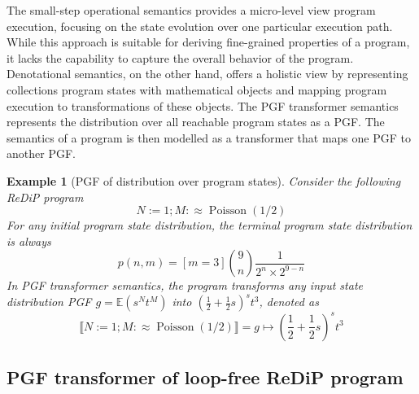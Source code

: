 \documentclass[a4paper]{article}
\renewcommand{\S}[1]{ \llbracket #1 \rrbracket }
\newcommand{\E}{ \mathbb{E} }
\newtheorem{example}[theorem]{Example}
\begin{document}
The small-step operational semantics provides a micro-level view program execution, focusing on the state evolution over one particular execution path. While this approach is suitable for deriving fine-grained properties of a program, it lacks the capability to capture the overall behavior of the program.
Denotational semantics, on the other hand, offers a holistic view by representing collections program states with mathematical objects and mapping program execution to transformations of these objects.
The PGF transformer semantics represents the distribution over all reachable program states as a PGF. The semantics of a program is then modelled as a transformer that maps one PGF to another PGF.

\begin{example}[PGF of distribution over program states]
	Consider the following ReDiP program
	\[
		N := 1; M :\approx \operatorname{Poisson}(1/2)
	\]
	For any initial program state distribution, the terminal program state distribution is always
	\[
		p(n,m) = [m=3] \binom{9}{n}\frac{1}{2^n \times 2^{9-n}}
	\]
	In PGF transformer semantics, the program transforms any input state distribution PGF \(g=\E(s^N t^M)\) into \({\left( \frac12 + \frac12 s \right)}^s t^3\), denoted as
	\[
		\S{N := 1; M :\approx \operatorname{Poisson}(1/2)}
		= g\mapsto {\left( \frac12 + \frac12 s \right)}^s t^3
	\]
\end{example}

\subsection{PGF transformer of loop-free ReDiP program}
\end{document}
